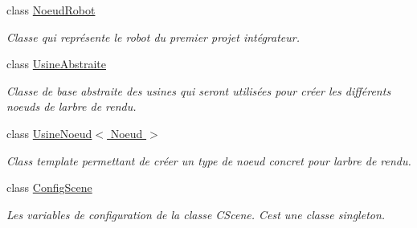 \begin{DoxyCompactItemize}
class \hyperlink{class_noeud_robot}{Noeud\+Robot}
\begin{DoxyCompactList}\small\item\em Classe qui représente le robot du premier projet intégrateur. \end{DoxyCompactList}\item 
class \hyperlink{class_usine_abstraite}{Usine\+Abstraite}
\begin{DoxyCompactList}\small\item\em Classe de base abstraite des usines qui seront utilisées pour créer les différents noeuds de l\textquotesingle{}arbre de rendu. \end{DoxyCompactList}\item 
class \hyperlink{class_usine_noeud}{Usine\+Noeud$<$ Noeud $>$}
\begin{DoxyCompactList}\small\item\em Class template permettant de créer un type de noeud concret pour l\textquotesingle{}arbre de rendu. \end{DoxyCompactList}\item 
class \hyperlink{class_config_scene}{Config\+Scene}
\begin{DoxyCompactList}\small\item\em Les variables de configuration de la classe C\+Scene. C\textquotesingle{}est une classe singleton. \end{DoxyCompactList}\end{DoxyCompactItemize}
